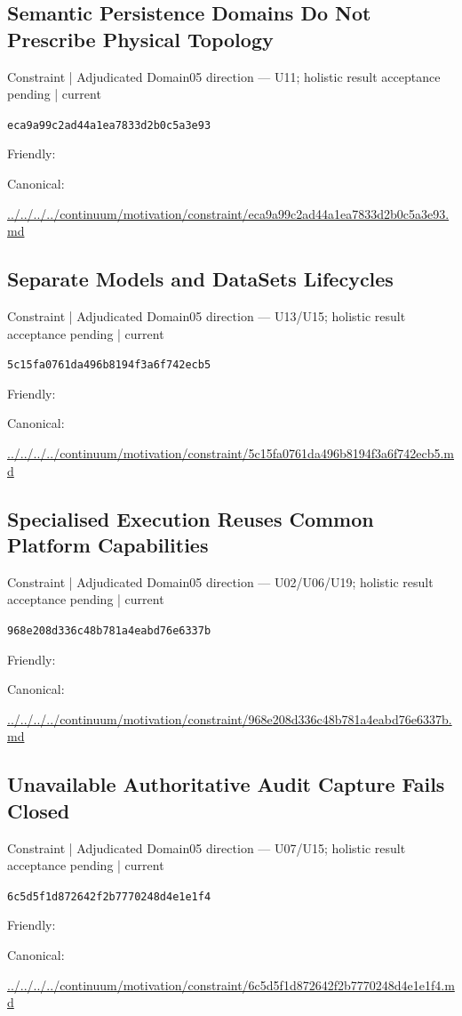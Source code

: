 \documentclass[10pt,a4paper]{article}
\begin{document}
\subsection*{Semantic Persistence Domains Do Not Prescribe Physical Topology}
{\small Constraint | Adjudicated Domain05 direction — U11; holistic result acceptance pending | current}\par
\texttt{eca9a99c2ad44a1ea7833d2b0c5a3e93}\par
Friendly: \par
Canonical: \par
{\footnotesize\url{../../../../continuum/motivation/constraint/eca9a99c2ad44a1ea7833d2b0c5a3e93.md}}\par
\subsection*{Separate Models and DataSets Lifecycles}
{\small Constraint | Adjudicated Domain05 direction — U13/U15; holistic result acceptance pending | current}\par
\texttt{5c15fa0761da496b8194f3a6f742ecb5}\par
Friendly: \par
Canonical: \par
{\footnotesize\url{../../../../continuum/motivation/constraint/5c15fa0761da496b8194f3a6f742ecb5.md}}\par
\subsection*{Specialised Execution Reuses Common Platform Capabilities}
{\small Constraint | Adjudicated Domain05 direction — U02/U06/U19; holistic result acceptance pending | current}\par
\texttt{968e208d336c48b781a4eabd76e6337b}\par
Friendly: \par
Canonical: \par
{\footnotesize\url{../../../../continuum/motivation/constraint/968e208d336c48b781a4eabd76e6337b.md}}\par
\subsection*{Unavailable Authoritative Audit Capture Fails Closed}
{\small Constraint | Adjudicated Domain05 direction — U07/U15; holistic result acceptance pending | current}\par
\texttt{6c5d5f1d872642f2b7770248d4e1e1f4}\par
Friendly: \par
Canonical: \par
{\footnotesize\url{../../../../continuum/motivation/constraint/6c5d5f1d872642f2b7770248d4e1e1f4.md}}\par
\end{document}
